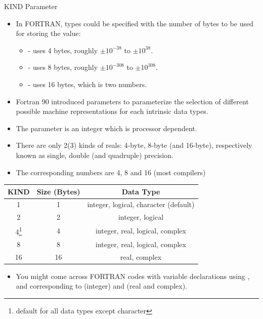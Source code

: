\documentclass[10pt,t]{beamer}
\begin{document}
\begin{frame}{KIND Parameter}
  \begin{itemize}
    \item In FORTRAN, types could be specified with the number of bytes to be used for storing the value:
      \begin{itemize}
        \item {} - uses 4 bytes, roughly $\pm10^{-38}$ to $\pm10^{38}$.
        \item {} - uses 8 bytes, roughly $\pm10^{-308}$ to $\pm10^{308}$.
        \item {} - uses 16 bytes, which is two  numbers.
      \end{itemize}
    \item Fortran 90 introduced  parameters to parameterize the selection of different possible machine representations for each intrinsic data types.
    \item The  parameter is an integer which is processor dependent.
    \item There are only 2(3) kinds of reals: 4-byte, 8-byte (and 16-byte), respectively known as single, double (and quadruple) precision.
    \item The corresponding  numbers are 4, 8 and 16 (most compilers)
  \end{itemize}
  \begin{minipage}{\textwidth}
    \begin{center}
      \begin{tabular}{|c|c|c|}
        \hline
        KIND & Size (Bytes) & Data Type \\
        \hline
        1 & 1 & integer, logical, character (default) \\
        2 & 2 & integer, logical \\
        4\footnote{\tiny default for all data types except character} & 4 & integer, real, logical, complex \\
        8 & 8 & integer, real, logical, complex \\
        16 & 16 & real, complex \\
        \hline
      \end{tabular}
    \end{center}
  \end{minipage}
  \begin{itemize}
    \item You might come across FORTRAN codes with variable declarations using ,  and  corresponding to  (integer) and  (real and complex).

\end{itemize}
\end{frame}
\end{document}
